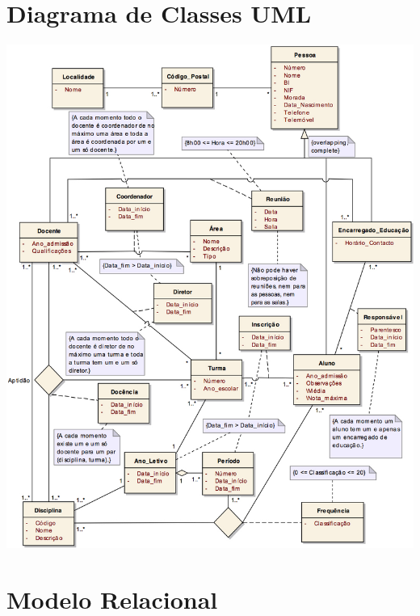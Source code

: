 \documentclass[12pt,a4paper,reqno]{report}
\numberwithin{figure}{section}
\numberwithin{equation}{section}
\begin{document}
\chapter{Diagrama de Classes UML}

\begin{center}

\includegraphics[width=16cm]{conceptual2.jpg}

\end{center}

\chapter{Modelo Relacional}
\end{document}
